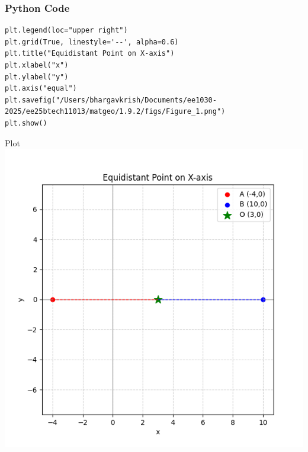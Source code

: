 \documentclass{beamer}
\begin{document}
\begin{frame}[fragile]
    \frametitle{Python Code}
    \begin{lstlisting}
plt.legend(loc="upper right")
plt.grid(True, linestyle='--', alpha=0.6)
plt.title("Equidistant Point on X-axis")
plt.xlabel("x")
plt.ylabel("y")
plt.axis("equal")
plt.savefig("/Users/bhargavkrish/Documents/ee1030-2025/ee25btech11013/matgeo/1.9.2/figs/Figure_1.png")
plt.show()
    \end{lstlisting}
\end{frame}

\begin{frame}{Plot}
    \centering
    \includegraphics[width=3\columnwidth, height=0.8\textheight, keepaspectratio]{figs/Figure_1.png}     
\end{frame}
\end{document}
